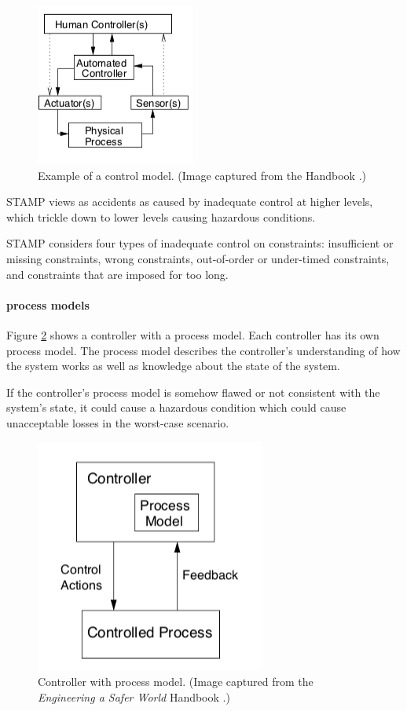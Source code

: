 \documentclass[../../main/main.tex]{subfiles}
\begin{document}
\begin{figure}[h!]
\centering
\includegraphics[width=0.5\linewidth]{../figures/controlmodel}
\caption{\label{controlmodel} Example of a control model. (Image captured from the  Handbook \cite{stpa}.)}
\end{figure}
STAMP views as accidents as caused by inadequate control at higher levels, which trickle down to lower levels causing hazardous conditions.  

STAMP considers four types of inadequate control on constraints: insufficient or missing constraints, wrong constraints, out-of-order or under-timed constraints, and constraints that are imposed for too long. 

\paragraph*{process models}
Figure \ref{processmodel} shows a controller with a process model.  Each controller has its own process model.  The process model describes the controller's understanding of how the system works as well as knowledge about the state of the system.  

If the controller's process model is somehow flawed or not consistent with the system's state, it could cause a hazardous condition which could cause unacceptable losses in the worst-case scenario.

\begin{figure}[h!]
\centering
\includegraphics[width=0.5\linewidth]{../figures/processmodel}
\caption{\label{processmodel} Controller with process model. (Image captured from the \textit{Engineering a Safer World} Handbook \cite{saferworld}.)}
\end{figure}
\end{document}
